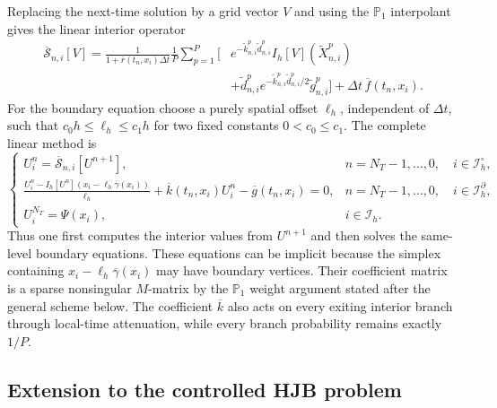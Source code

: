 \documentclass[10pt,a4paper]{amsart}
\newcommand{\cS}{\mathcal{S}}
\newcommand{\dt}{\Delta t}
\begin{document}
	Replacing the next-time solution by a grid vector $V$ and using the $\mathbb P_1$ interpolant gives the linear interior operator
	\begin{equation}
		\begin{aligned}
			\overline{\cS}_{n,i}[V]
			=\frac{1}{1+\overline r(t_n,x_i)\dt}\frac1P\sum_{p=1}^P
			\Big[&e^{-\widetilde k_{n,i}^p\widetilde d_{n,i}^p}
			I_h[V](\widetilde X_{n,i}^p)\\
			&+\widetilde d_{n,i}^p
			e^{-\widetilde k_{n,i}^p\widetilde d_{n,i}^p/2}
			\widetilde g_{n,i}^p\Big]
			+\dt\,\overline f(t_n,x_i).
		\end{aligned}
		\label{eq:linear-scheme}
	\end{equation}
	For the boundary equation choose a purely spatial offset $\ell_h$, independent
	of $\dt$, such that $c_0h\le\ell_h\le c_1h$ for two fixed constants
	$0<c_0\le c_1$.  The complete linear method is
	\begin{equation}
		\begin{cases}
			U_i^n=\overline{\cS}_{n,i}[U^{n+1}],
			&n=N_T-1,\ldots,0,\quad i\in\mathcal I_h^\circ,\\[6pt]
			\displaystyle
			\frac{U_i^n-I_h[U^n](x_i-\ell_h\overline\gamma(x_i))}{\ell_h}
			+\overline k(t_n,x_i)U_i^n-\overline g(t_n,x_i)=0,
			&n=N_T-1,\ldots,0,\quad i\in\mathcal I_h^\partial,\\[9pt]
			U_i^{N_T}=\Psi(x_i),&i\in\mathcal I_h .
		\end{cases}
		\label{eq:complete-linear-scheme}
	\end{equation}
	Thus one first computes the interior values from $U^{n+1}$ and then solves
	the same-level boundary equations.  These equations can be implicit because
	the simplex containing $x_i-\ell_h\overline\gamma(x_i)$ may have boundary
	vertices.  Their coefficient matrix is a sparse nonsingular $M$-matrix by
	the $\mathbb P_1$ weight argument stated after the general scheme below.
	The coefficient $\overline k$ also acts on every exiting interior branch
	through local-time attenuation, while every branch probability remains
	exactly $1/P$.
	\subsection{Extension to the controlled HJB problem}
	
\end{document}
